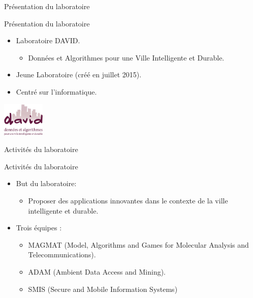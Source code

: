 \documentclass[10 pt]{beamer}
\begin{document}
\begin{section}{Pr\'esentation du laboratoire}

\begin{frame}{Pr\'esentation du laboratoire}
\begin{itemize}
\item Laboratoire DAVID.
\begin{itemize}
\item Donn\'ees et Algorithmes pour une Ville Intelligente et Durable.
\end{itemize}
\vspace{0,5cm}
\item Jeune Laboratoire (cr\'e\'e en juillet 2015).
\vspace{1cm}
\item Centr\'e sur l'informatique.
\end{itemize}
\hspace{8cm} \includegraphics [width=20mm]{logod.png}

\end{frame}

\begin{subsection}{Activit\'es du laboratoire}
\begin{frame}{Activit\'es du laboratoire}
\begin{itemize}
\item But du laboratoire:
\begin{itemize}
\item Proposer des applications innovantes dans le contexte de la ville intelligente et durable.
\end{itemize}
\vspace{0,5cm}
\item Trois \'equipes :
\begin{itemize}
\item MAGMAT (Model, Algorithms and Games for Molecular Analysis and Telecommunications).
\vspace{0,15cm}
\item ADAM (Ambient Data Access and Mining).
\vspace{0,20cm}
\item SMIS (Secure and Mobile Information Systems)
\end{itemize}
\end{itemize}


\end{frame}
\end{subsection}
\end{section}
\end{document}

